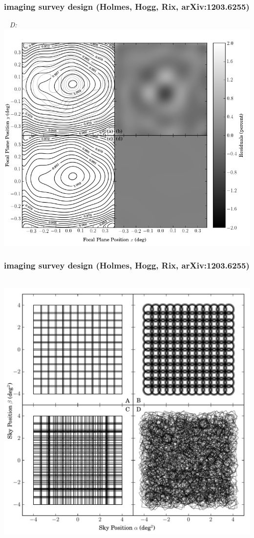 \documentclass[pdftex]{beamer}
\begin{document}
\begin{frame}
  \frametitle{imaging survey design {\footnotesize (Holmes, Hogg, Rix, arXiv:1203.6255)}}
  ~\hfill%
  \emph{D:}~\includegraphics[height=\figureheight]{./1203.6255v2/D_11_ff.png}
\end{frame}
\begin{frame}
  \frametitle{imaging survey design {\footnotesize (Holmes, Hogg, Rix, arXiv:1203.6255)}}
  ~\hfill%
  \includegraphics[height=\figureheight]{./1203.6255v2/simple_surveys.pdf}
\end{frame}
\end{document}
